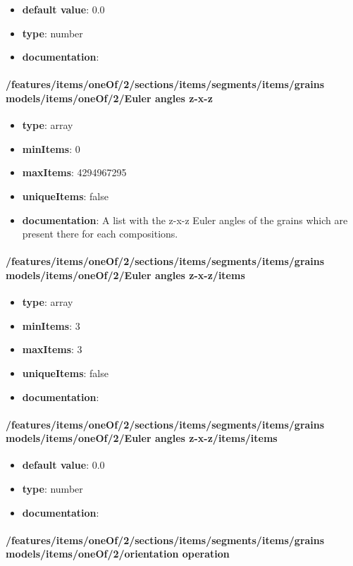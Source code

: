 \begin{itemize}\item {\bf default value}: 0.0
\item {\bf type}: number
\item {\bf documentation}: 
\end{itemize}\paragraph{/features/items/oneOf/2/sections/items/segments/items/grains models/items/oneOf/2/Euler angles z-x-z}
\begin{itemize}\item {\bf type}: array
\item {\bf minItems}: 0
\item {\bf maxItems}: 4294967295
\item {\bf uniqueItems}: false
\item {\bf documentation}: A list with the z-x-z Euler angles of the grains which are present there for each compositions.
\end{itemize}\paragraph{/features/items/oneOf/2/sections/items/segments/items/grains models/items/oneOf/2/Euler angles z-x-z/items}
\begin{itemize}\item {\bf type}: array
\item {\bf minItems}: 3
\item {\bf maxItems}: 3
\item {\bf uniqueItems}: false
\item {\bf documentation}: 
\end{itemize}\paragraph{/features/items/oneOf/2/sections/items/segments/items/grains models/items/oneOf/2/Euler angles z-x-z/items/items}
\begin{itemize}\item {\bf default value}: 0.0
\item {\bf type}: number
\item {\bf documentation}: 
\end{itemize}\paragraph{/features/items/oneOf/2/sections/items/segments/items/grains models/items/oneOf/2/orientation operation}
